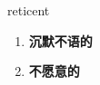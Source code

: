 
\begin{frame}
{\huge reticent}
\begin{center}
\begin{enumerate}\Large
  \item \textbf{沉默不语的}
  \item \textbf{不愿意的}
\end{enumerate}
\end{center}
\end{frame}
